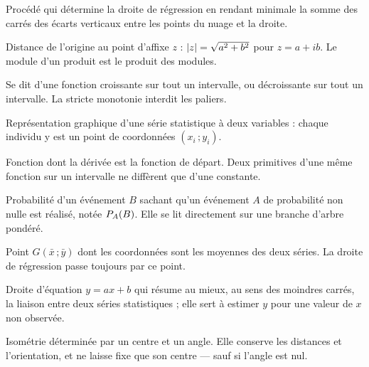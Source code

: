 
Procédé qui détermine la droite de régression en rendant minimale la somme
des carrés des écarts verticaux entre les points du nuage et la droite.

Distance de l'origine au point d'affixe $z$ : $\abs z = \sqrt{a^{2}+b^{2}}$
pour $z = a+ib$. Le module d'un produit est le produit des modules.

Se dit d'une fonction croissante sur tout un intervalle, ou décroissante sur
tout un intervalle. La stricte monotonie interdit les paliers.


Représentation graphique d'une série statistique à deux variables : chaque
individu y est un point de coordonnées $(x_{i}\,;y_{i})$.


Fonction dont la dérivée est la fonction de départ. Deux primitives d'une même
fonction sur un intervalle ne diffèrent que d'une constante.

Probabilité d'un événement $B$ sachant qu'un événement $A$ de probabilité non
nulle est réalisé, notée $\probacond BA$. Elle se lit directement sur une
branche d'arbre pondéré.

Point $G\left(\bar x\,;\bar y\right)$ dont les coordonnées sont les moyennes
des deux séries. La droite de régression passe toujours par ce point.


Droite d'équation $y = ax+b$ qui résume au mieux, au sens des moindres
carrés, la liaison entre deux séries statistiques ; elle sert à estimer $y$
pour une valeur de $x$ non observée.

Isométrie déterminée par un centre et un angle. Elle conserve les distances et
l'orientation, et ne laisse fixe que son centre — sauf si l'angle est nul.


